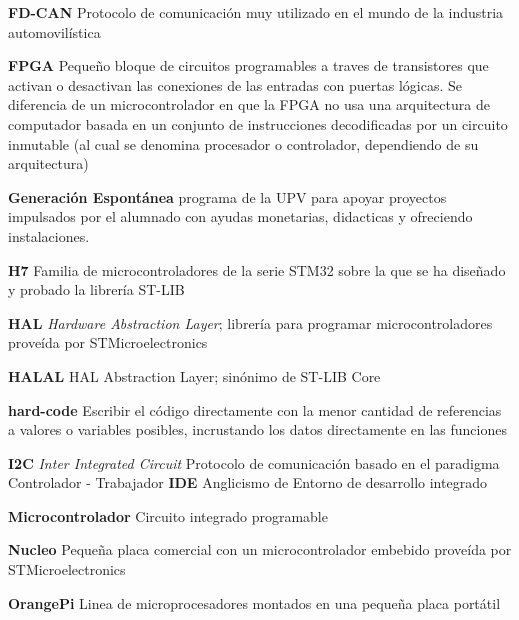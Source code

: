 \documentclass{report}
\begin{document}
\textbf{FD-CAN} Protocolo de comunicación muy utilizado en el mundo de la industria automovilística 
\par \vspace{0.2 cm}
\textbf{FPGA} Pequeño bloque de circuitos programables a traves de transistores que activan o desactivan las conexiones de las entradas con puertas lógicas. Se diferencia de un microcontrolador en que la FPGA no usa una arquitectura de computador basada en un conjunto de instrucciones decodificadas por un circuito inmutable (al cual se denomina procesador o controlador, dependiendo de su arquitectura)
\par \vspace{0.2 cm}
\textbf{Generación Espontánea} programa de la UPV para apoyar proyectos impulsados por el alumnado con ayudas monetarias, didacticas y ofreciendo instalaciones. 
\par \vspace{0.2 cm}
\textbf{H7} Familia de microcontroladores de la serie STM32 sobre la que se ha diseñado y probado la librería ST-LIB
\par \vspace{0.2 cm}
\textbf{HAL} \textit{Hardware Abstraction Layer}; librería para programar microcontroladores proveída por STMicroelectronics
\par \vspace{0.2 cm}
\textbf{HALAL} HAL Abstraction Layer; sinónimo de ST-LIB Core
\par \vspace{0.2 cm}
\textbf{hard-code} Escribir el código directamente con la menor cantidad de referencias a valores o variables posibles, incrustando los datos directamente en las funciones
\par \vspace{0.2 cm}
\textbf{I2C} \textit{Inter Integrated Circuit} Protocolo de comunicación basado  en el paradigma Controlador - Trabajador
\textbf{IDE} Anglicismo de Entorno de desarrollo integrado
\par \vspace{0.2 cm}
\textbf{Microcontrolador} Circuito integrado programable
\par \vspace{0.2 cm}
\textbf{Nucleo} Pequeña placa comercial con un microcontrolador embebido proveída por STMicroelectronics
\par \vspace{0.2 cm}
\textbf{OrangePi} Linea de microprocesadores montados en una pequeña placa portátil
\par \vspace{0.2 cm}
\end{document}

